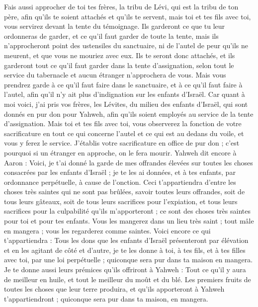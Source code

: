 \begin{multicols}{2}
Fais aussi approcher de toi tes frères, la tribu de Lévi, qui est la tribu de ton père, afin qu'ils te soient attachés et qu'ils te servent, mais toi et tes fils avec toi, vous servirez devant la tente du témoignage.
Ils garderont ce que tu leur ordonneras de garder, et ce qu'il faut garder de toute la tente,  mais ils n'approcheront point des ustensiles du sanctuaire, ni de l'autel de peur qu'ils ne meurent, et que vous ne mouriez avec eux.
Ils te seront donc attachés, et ils garderont tout ce qu'il faut garder dans la tente d'assignation, selon tout le service du tabernacle et aucun étranger n'approchera de vous.
Mais vous prendrez garde à ce qu'il faut faire dans le sanctuaire, et à ce qu'il faut faire à l'autel, afin qu'il n'y ait plus d'indignation sur les enfants d'Israël.
Car quant à moi voici, j'ai pris vos frères, les Lévites, du milieu des enfants d'Israël, qui sont donnés en pur don pour Yahweh, afin qu'ils soient employés au service de la tente d'assignation.
Mais toi et tes fils avec toi, vous observerez la fonction de votre sacrificature en tout ce qui concerne l’autel et ce qui est au dedans du voile, et vous y ferez le service. J’établis votre sacrificature en office de pur don ; c’est pourquoi si un étranger en approche, on le fera mourir.
Yahweh dit encore à Aaron : Voici, je t'ai donné la garde de mes offrandes élevées sur toutes les choses consacrées par les enfants d'Israël ; je te les ai données, et à tes enfants, par ordonnance perpétuelle, à cause de l'onction.
Ceci t'appartiendra d'entre les choses très saintes qui ne sont pas brûlées, savoir toutes leurs offrandes, soit de tous leurs gâteaux, soit de tous leurs sacrifices pour l'expiation, et tous leurs sacrifices pour la culpabilité qu'ils m'apporteront ; ce sont des choses très saintes pour toi et pour tes enfants.
Vous les mangerez dans un lieu très saint ; tout mâle en mangera ; vous les regarderez comme saintes.
Voici encore ce qui t'appartiendra : Tous les dons que les enfants d'Israël présenteront par élévation et en les agitant de côté et d'autre, je te les donne à toi, à tes fils, et à tes filles avec toi, par une loi perpétuelle ; quiconque sera pur dans ta maison en mangera.
Je te donne aussi leurs prémices qu'ils offriront à Yahweh : Tout ce qu'il y aura de meilleur en huile, et tout le meilleur du moût et du blé.
Les premiers fruits de toutes les choses que leur terre produira, et qu’ils apporteront à Yahweh t’appartiendront ; quiconque sera pur dans ta maison, en mangera.

\end{multicols}
